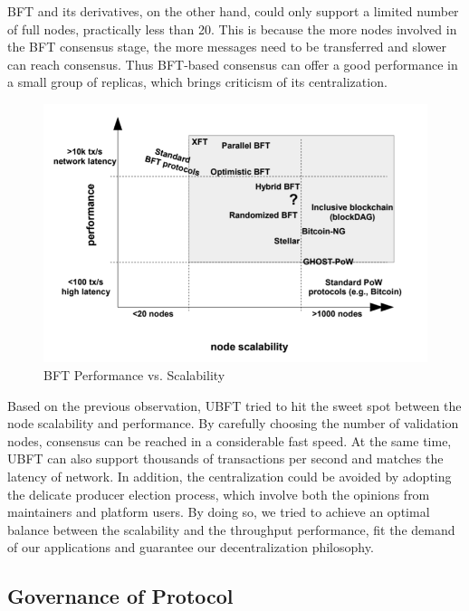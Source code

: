 BFT and its derivatives, on the other hand, could only support a limited number of full nodes, practically less than 20. This is because the more nodes involved in the BFT consensus stage, the more messages need to be transferred and slower can reach consensus. Thus BFT-based consensus can offer a good performance in a small group of replicas, which brings criticism of its centralization.

\begin{figure}
\centering
\includegraphics[width=  \linewidth]{bft_perf.png}
\caption{BFT Performance vs. Scalability}
\label{fig:bft_perf}
\end{figure}   

Based on the previous observation, UBFT tried to hit the sweet spot between the node scalability and performance. By carefully choosing the number of validation nodes, consensus can be reached in a considerable fast speed. At the same time, UBFT can also support thousands of transactions per second and matches the latency of network. In addition, the centralization could be avoided by adopting the delicate producer election process, which involve both the opinions from maintainers and platform users. By doing so, we tried to achieve an optimal balance between the scalability and the throughput performance, fit the demand of our applications and guarantee our decentralization philosophy.

\subsection{Governance of Protocol}


